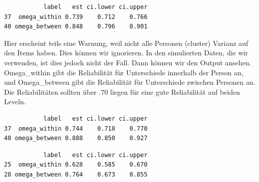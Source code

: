 \documentclass[
  letterpaper,
  DIV=11,
  numbers=noendperiod]{scrreprt}
\newenvironment{Shaded}{\begin{snugshade}}{\end{snugshade}}
\newcommand{\AttributeTok}[1]{\textcolor[rgb]{0.40,0.45,0.13}{#1}}
\newcommand{\FunctionTok}[1]{\textcolor[rgb]{0.28,0.35,0.67}{#1}}
\newcommand{\NormalTok}[1]{\textcolor[rgb]{0.00,0.23,0.31}{#1}}
\newcommand{\OtherTok}[1]{\textcolor[rgb]{0.00,0.23,0.31}{#1}}
\newcommand{\SpecialCharTok}[1]{\textcolor[rgb]{0.37,0.37,0.37}{#1}}
\newcommand{\StringTok}[1]{\textcolor[rgb]{0.13,0.47,0.30}{#1}}
\begin{document}
\begin{verbatim}
           label   est ci.lower ci.upper
37  omega_within 0.739    0.712    0.766
40 omega_between 0.848    0.796    0.901
\end{verbatim}

Hier erscheint teils eine Warnung, weil nicht alle Personen (cluster)
Varianz auf den Items haben. Dies können wir ignorieren. In den
simulierten Daten, die wir verwenden, ist dies jedoch nicht der Fall.
Dann können wir den Output ansehen. Omega\_within gibt die Reliabilität
für Unterschiede innerhalb der Person an, und Omega\_between gibt die
Reliabilität für Unterschiede zwischen Personen an. Die Reliabilitäten
sollten über .70 liegen für eine gute Reliabilität auf beiden Leveln.

\begin{Shaded}
\end{Shaded}

\begin{verbatim}
           label   est ci.lower ci.upper
37  omega_within 0.744    0.718    0.770
40 omega_between 0.888    0.850    0.927
\end{verbatim}

\begin{Shaded}
\end{Shaded}

\begin{verbatim}
           label   est ci.lower ci.upper
25  omega_within 0.628    0.585    0.670
28 omega_between 0.764    0.673    0.855
\end{verbatim}
\end{document}

